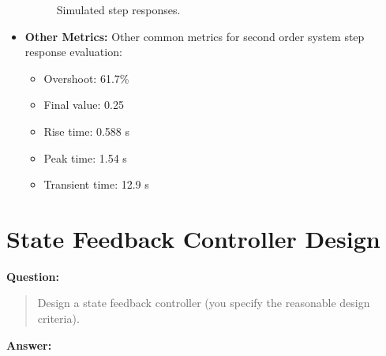\documentclass[12pt, oneside]{article}
\begin{document}
\begin{itemize}
        \begin{figure}[htbp]
          \centering
          \quad %
          \caption{Simulated step responses.}
        \end{figure}

    \item \textbf{Other Metrics:}  Other common metrics for second order system step response evaluation:
        \begin{itemize}
            \item Overshoot: 61.7\%
            \item Final value: 0.25
            \item Rise time: 0.588 s
            \item Peak time: 1.54 s
            \item Transient time: 12.9 s
        \end{itemize}
\end{itemize}



\section{State Feedback Controller Design}
\textbf{Question:}
\begin{quote}
Design a state feedback controller (you specify the reasonable design criteria).
\end{quote}
\textbf{Answer:}
\end{document}
